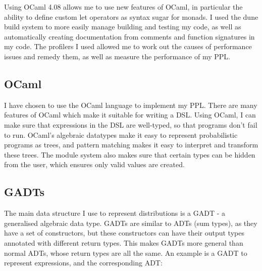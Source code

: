 Using OCaml 4.08 allows me to use new features of OCaml, in particular the ability to define custom let operators as syntax sugar for monads. I used the dune build system to more easily manage building and testing my code, as well as automatically creating documentation from comments and function signatures in my code. The profilers I used allowed me to work out the causes of performance issues and remedy them, as well as measure the performance of my PPL.

\subsection{OCaml}
I have chosen to use the OCaml language to implement my PPL. There are many features of OCaml which make it suitable for writing a DSL. Using OCaml, I can make sure that expressions in the DSL are well-typed, so that programs don't fail to run. OCaml's algebraic datatypes make it easy to represent probabilistic programs as trees, and pattern matching makes it easy to interpret and transform these trees. The module system also makes sure that certain types can be hidden from the user, which ensures only valid values are created.

\subsection{GADTs}
The main data structure I use to represent distributions is a GADT - a generalised algebraic data type. GADTs are similar to ADTs (sum types), as they have a set of constructors, but these constructors can have their output types annotated with different return types. This makes GADTs more general than normal ADTs, whose return types are all the same. An example is a GADT to represent expressions, and the corresponding ADT:

\begin{figure*}[!hbt]
	\begin{minipage}{0.45\linewidth}
	\end{minipage}
	\begin{minipage}{0.45\linewidth}
	\end{minipage}
\end{figure*}

